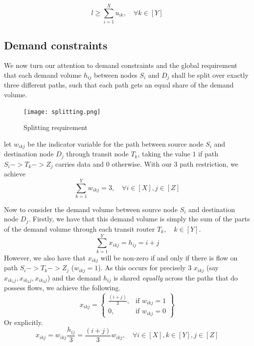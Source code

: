 \documentclass[12pt,twoside]{article}
\begin{document}
\begin{equation}
	l \geq \sum_{i=1}^{X}u_{ik},   \quad  \forall k \in [Y]
\end{equation}



\subsection{Demand constraints}
We now turn our attention to demand constraints and the global requirement that each demand volume $h_{ij}$ between nodes $S_i$ and $D_j$ shall be split over exactly three different paths, such that each path gets an equal
share of the demand volume.

\begin{figure}[htb]
	\centering
	\texttt{[image: splitting.png]}
	\caption{Splitting requirement}
	\label{splitting}
\end{figure}%

let $w_{ikj}$ be the indicator variable for the path between source node $S_i$ and destination node $D_j$ through transit node $T_k$, taking the value $1$ if path $S_i->T_k->Z_j$ carries data and $0$ otherwise. With our 3 path restriction, we achieve
\begin{equation}
	\sum_{k=1}^{Y}w_{ikj} = 3,   \quad  \forall i \in [X],j \in [Z]
\end{equation}


Now to consider the demand volume between source node $S_i$ and destination node $D_j$. Firstly, we have that this demand volume is simply the sum of the parts of the demand volume through each transit router $T_k,\quad k \in [Y]$.
\begin{equation*}
	\sum_{k=1}^{Y}x_{ikj} = h_{ij}=i+j
\end{equation*}
However, we also have that $x_{ikj}$ will be non-zero if and only if there is flow on path $S_i->T_k->Z_j$ ($w_{ikj} = 1$). As this occurs for precisely 3 $x_{ikj}$ (say $x_{ik_1j}, x_{ik_2j}, x_{ik_3j}$) and the demand $h_{ij}$ is shared \emph{equally} across the paths that do possess flows, we achieve the following.
\[
x_{ikj}  = \left\{\begin{array}{lr}
\frac{(i + j)}{3}, & \text{if } w_{ikj} = 1\\
0, & \text{if } w_{ikj} = 0
\end{array}\right\}
\]
Or explicitly.
\begin{equation}
	x_{ikj} = w_{ikj} \frac{h_{ij}}{3} = \frac{(i + j)}{3}w_{ikj},\quad  \forall i \in [X],k \in [Y],j \in [Z]
\end{equation}
\end{document}
